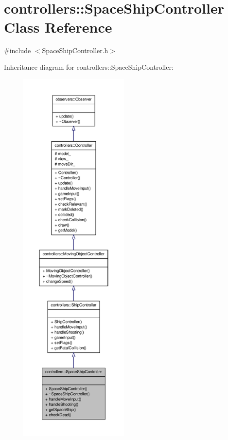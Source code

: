 \hypertarget{classcontrollers_1_1SpaceShipController}{\section{controllers\-:\-:\-Space\-Ship\-Controller \-Class \-Reference}
\label{d9/d89/classcontrollers_1_1SpaceShipController}
}


{\ttfamily \#include $<$\-Space\-Ship\-Controller.\-h$>$}



\-Inheritance diagram for controllers\-:\-:\-Space\-Ship\-Controller\-:
\nopagebreak
\begin{figure}[H]
\begin{center}
\leavevmode
\includegraphics[height=550pt]{d7/d90/classcontrollers_1_1SpaceShipController__inherit__graph}
\end{center}
\end{figure}



